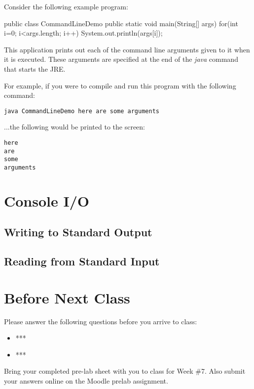 Consider the following example program:

\begin{code}
public class CommandLineDemo {
  public static void main(String[] args) {
    for(int i=0; i<args.length; i++) {
      System.out.println(args[i]);
    }
  }
}
\end{code}

This application prints out each of the command line arguments given to it when it is executed. These arguments are specified at the end of the \textit{java} command that starts the JRE. 

For example, if you were to compile and run this program with the following command:

\begin{verbatim}
java CommandLineDemo here are some arguments
\end{verbatim}

...the following would be printed to the screen:

\begin{verbatim}
here
are
some
arguments
\end{verbatim}



\section{Console I/O}

\subsection{Writing to Standard Output}

\subsection{Reading from Standard Input}



\section{Before Next Class}

Please answer the following questions before you arrive to class:

\begin{exer}

\begin{itemize}

\item ***

  \evalline
  
\item ***

  \evalline
  
\end{itemize}

\end{exer}

Bring your completed pre-lab sheet with you to class for Week \#7. Also submit your answers online on the Moodle prelab assignment.  

